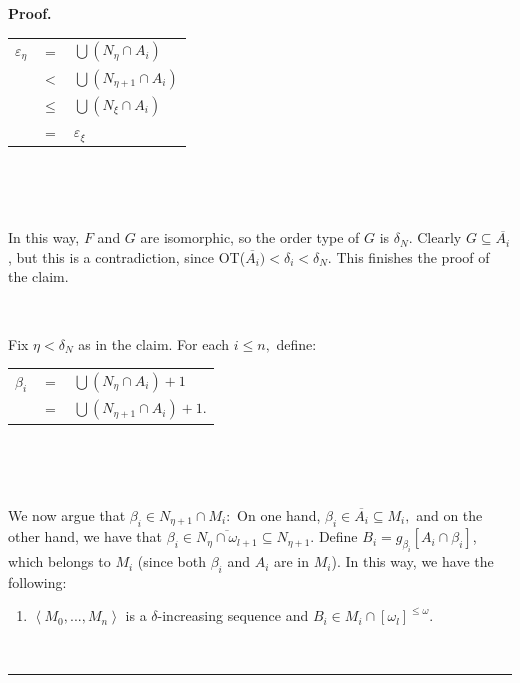 \documentclass[10pt,a4paper]{amsart}
\newenvironment{proof}[1][Proof]{\noindent\textbf{#1.} }{\ \rule{0.5em}{0.5em}}
\begin{document}
\begin{proof}
\hfill%
\begin{tabular}
[c]{lll}%
$\varepsilon_{\eta}$ & $=$ & $%
{\displaystyle\bigcup}
\left(  N_{\eta}\cap A_{i}\right)  $\\
& $<$ & $%
{\displaystyle\bigcup}
\left(  N_{\eta+1}\cap A_{i}\right)  $\\
& $\leq$ & $%
{\displaystyle\bigcup}
\left(  N_{\xi}\cap A_{i}\right)  $\\
& $=$ & $\varepsilon_{\xi}$%
\end{tabular}
\qquad\qquad\ \qquad\qquad\qquad\hfill

\qquad\ \ \ \ \qquad\ \ \ \ \ 

In this way, $F$ and $G$ are isomorphic, so the order type of $G$ is
$\delta_{N}.$ Clearly $G\subseteq\overline{A_{i}}$, but this is a
contradiction, since \textsf{OT(}$\overline{A_{i}})<\delta_{i}<\delta_{N}$.
This finishes the proof of the claim.

\qquad\qquad\ \ 

Fix $\eta<\delta_{N}$ as in the claim. For each $i\leq n,$ define:\medskip

\hfill%
\begin{tabular}
[c]{lll}%
$\beta_{i}$ & $=$ & $%
{\displaystyle\bigcup}
\left(  N_{\eta}\cap A_{i}\right)  +1$\\
& $=$ & $%
{\displaystyle\bigcup}
\left(  N_{\eta+1}\cap A_{i}\right)  +1.$%
\end{tabular}
\qquad\qquad\qquad\ \qquad\qquad\hfill

\qquad\ \ \ \ \qquad\ \ \ \ \ 

We now argue that $\beta_{i}\in N_{\eta+1}\cap M_{i}:$ On one hand, $\beta
_{i}\in\overline{A_{i}}\subseteq M_{i},$ and on the other hand, we have that
$\beta_{i}\in\overline{N_{\eta}\cap\omega_{l+1}}\subseteq N_{\eta+1}.$ Define
$B_{i}=g_{\beta_{i}}\left[  A_{i}\cap\beta_{i}\right]  $, which belongs to
$M_{i}$ (since both $\beta_{i}$ and $A_{i}$ are in $M_{i}$). In this way, we
have the following:

\begin{enumerate}
\item $\left\langle M_{0},...,M_{n}\right\rangle $ is a $\delta$-increasing
sequence and $B_{i}\in M_{i}\cap\left[  \omega_{l}\right]  ^{\leq\omega}$.


\end{enumerate}
\end{proof}
\end{document}
